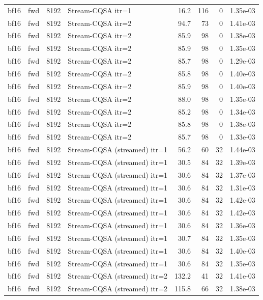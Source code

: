 \begin{tabular}{llrlrrrl}
bf16 & fwd & 8192 & Stream-CQSA itr=1 & 16.2 & 116 & 0 & 1.35e-03 \\
bf16 & fwd & 8192 & Stream-CQSA itr=2 & 94.7 & 73 & 0 & 1.41e-03 \\
bf16 & fwd & 8192 & Stream-CQSA itr=2 & 85.9 & 98 & 0 & 1.38e-03 \\
bf16 & fwd & 8192 & Stream-CQSA itr=2 & 85.9 & 98 & 0 & 1.35e-03 \\
bf16 & fwd & 8192 & Stream-CQSA itr=2 & 85.7 & 98 & 0 & 1.29e-03 \\
bf16 & fwd & 8192 & Stream-CQSA itr=2 & 85.8 & 98 & 0 & 1.40e-03 \\
bf16 & fwd & 8192 & Stream-CQSA itr=2 & 85.9 & 98 & 0 & 1.40e-03 \\
bf16 & fwd & 8192 & Stream-CQSA itr=2 & 88.0 & 98 & 0 & 1.35e-03 \\
bf16 & fwd & 8192 & Stream-CQSA itr=2 & 85.2 & 98 & 0 & 1.34e-03 \\
bf16 & fwd & 8192 & Stream-CQSA itr=2 & 85.8 & 98 & 0 & 1.38e-03 \\
bf16 & fwd & 8192 & Stream-CQSA itr=2 & 85.7 & 98 & 0 & 1.33e-03 \\
bf16 & fwd & 8192 & Stream-CQSA (streamed) itr=1 & 56.2 & 60 & 32 & 1.44e-03 \\
bf16 & fwd & 8192 & Stream-CQSA (streamed) itr=1 & 30.5 & 84 & 32 & 1.39e-03 \\
bf16 & fwd & 8192 & Stream-CQSA (streamed) itr=1 & 30.6 & 84 & 32 & 1.37e-03 \\
bf16 & fwd & 8192 & Stream-CQSA (streamed) itr=1 & 30.6 & 84 & 32 & 1.31e-03 \\
bf16 & fwd & 8192 & Stream-CQSA (streamed) itr=1 & 30.6 & 84 & 32 & 1.42e-03 \\
bf16 & fwd & 8192 & Stream-CQSA (streamed) itr=1 & 30.6 & 84 & 32 & 1.42e-03 \\
bf16 & fwd & 8192 & Stream-CQSA (streamed) itr=1 & 30.6 & 84 & 32 & 1.36e-03 \\
bf16 & fwd & 8192 & Stream-CQSA (streamed) itr=1 & 30.7 & 84 & 32 & 1.35e-03 \\
bf16 & fwd & 8192 & Stream-CQSA (streamed) itr=1 & 30.6 & 84 & 32 & 1.40e-03 \\
bf16 & fwd & 8192 & Stream-CQSA (streamed) itr=1 & 30.6 & 84 & 32 & 1.35e-03 \\
bf16 & fwd & 8192 & Stream-CQSA (streamed) itr=2 & 132.2 & 41 & 32 & 1.41e-03 \\
bf16 & fwd & 8192 & Stream-CQSA (streamed) itr=2 & 115.8 & 66 & 32 & 1.38e-03 \\

\end{tabular}
